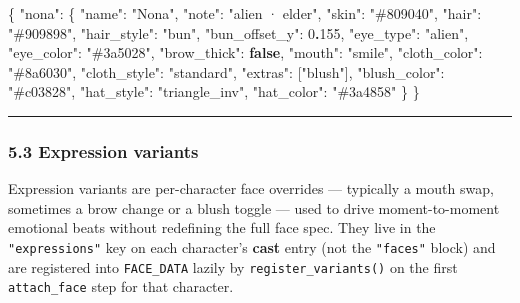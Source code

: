 \documentclass[
  11pt,
]{book}
\newenvironment{Shaded}{}{}
\newcommand{\DataTypeTok}[1]{\textcolor[rgb]{0.56,0.13,0.00}{#1}}
\newcommand{\DecValTok}[1]{\textcolor[rgb]{0.25,0.63,0.44}{#1}}
\newcommand{\ErrorTok}[1]{\textcolor[rgb]{1.00,0.00,0.00}{\textbf{#1}}}
\newcommand{\FunctionTok}[1]{\textcolor[rgb]{0.02,0.16,0.49}{#1}}
\newcommand{\KeywordTok}[1]{\textcolor[rgb]{0.00,0.44,0.13}{\textbf{#1}}}
\newcommand{\OtherTok}[1]{\textcolor[rgb]{0.00,0.44,0.13}{#1}}
\newcommand{\StringTok}[1]{\textcolor[rgb]{0.25,0.44,0.63}{#1}}
\begin{document}
\begin{Shaded}
\begin{Highlighting}[]
\FunctionTok{\{}
  \DataTypeTok{"nona"}\FunctionTok{:} \FunctionTok{\{}
    \DataTypeTok{"name"}\FunctionTok{:}         \StringTok{"Nona"}\FunctionTok{,}
    \DataTypeTok{"note"}\FunctionTok{:}         \StringTok{"alien · elder"}\FunctionTok{,}
    \DataTypeTok{"skin"}\FunctionTok{:}         \StringTok{"\#809040"}\FunctionTok{,}
    \DataTypeTok{"hair"}\FunctionTok{:}         \StringTok{"\#909898"}\FunctionTok{,}
    \DataTypeTok{"hair\_style"}\FunctionTok{:}   \StringTok{"bun"}\FunctionTok{,}
    \DataTypeTok{"bun\_offset\_y"}\FunctionTok{:} \DecValTok{0}\ErrorTok{.}\DecValTok{155}\FunctionTok{,}
    \DataTypeTok{"eye\_type"}\FunctionTok{:}     \StringTok{"alien"}\FunctionTok{,}
    \DataTypeTok{"eye\_color"}\FunctionTok{:}    \StringTok{"\#3a5028"}\FunctionTok{,}
    \DataTypeTok{"brow\_thick"}\FunctionTok{:}   \KeywordTok{false}\FunctionTok{,}
    \DataTypeTok{"mouth"}\FunctionTok{:}        \StringTok{"smile"}\FunctionTok{,}
    \DataTypeTok{"cloth\_color"}\FunctionTok{:}  \StringTok{"\#8a6030"}\FunctionTok{,}
    \DataTypeTok{"cloth\_style"}\FunctionTok{:}  \StringTok{"standard"}\FunctionTok{,}
    \DataTypeTok{"extras"}\FunctionTok{:}       \OtherTok{[}\StringTok{"blush"}\OtherTok{]}\FunctionTok{,}
    \DataTypeTok{"blush\_color"}\FunctionTok{:}  \StringTok{"\#c03828"}\FunctionTok{,}
    \DataTypeTok{"hat\_style"}\FunctionTok{:}    \StringTok{"triangle\_inv"}\FunctionTok{,}
    \DataTypeTok{"hat\_color"}\FunctionTok{:}    \StringTok{"\#3a4858"}
  \FunctionTok{\}}
\FunctionTok{\}}
\end{Highlighting}
\end{Shaded}

\begin{center}\rule{0.5\linewidth}{0.5pt}\end{center}

\subsubsection{5.3 Expression variants}\label{expression-variants}

Expression variants are per-character face overrides --- typically a
mouth swap, sometimes a brow change or a blush toggle --- used to drive
moment-to-moment emotional beats without redefining the full face spec.
They live in the \texttt{"expressions"} key on each character's
\textbf{cast} entry (not the \texttt{"faces"} block) and are registered
into \texttt{FACE\_DATA} lazily by \texttt{register\_variants()} on the
first \texttt{attach\_face} step for that character.
\end{document}
